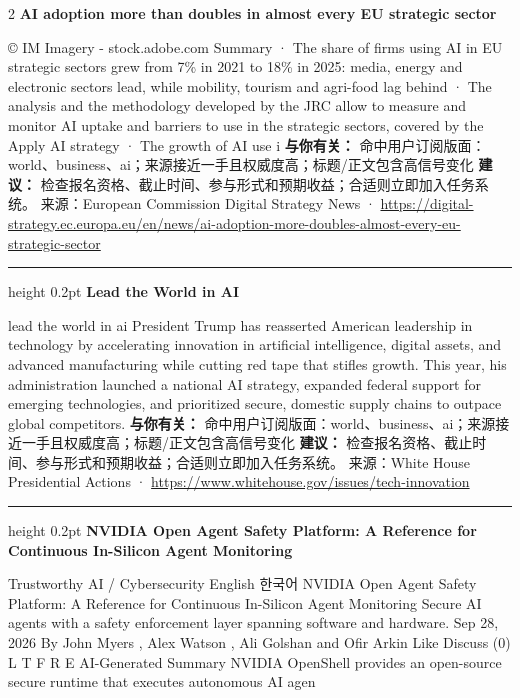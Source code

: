 \documentclass[10.5pt]{ctexart}
\begin{document}
\begin{multicols}{2}
{\large\bfseries AI adoption more than doubles in almost every EU strategic sector}\par
© IM Imagery - stock.adobe.com Summary · The share of firms using AI in EU strategic sectors grew from 7\% in 2021 to 18\% in 2025: media, energy and electronic sectors lead, while mobility, tourism and agri-food lag behind · The analysis and the methodology developed by the JRC allow to measure and monitor AI uptake and barriers to use in the strategic sectors, covered by the Apply AI strategy · The growth of AI use i
\textbf{与你有关：} 命中用户订阅版面：world、business、ai；来源接近一手且权威度高；标题/正文包含高信号变化
\textbf{建议：} 检查报名资格、截止时间、参与形式和预期收益；合适则立即加入任务系统。
{\footnotesize\color{ormuted} 来源：European Commission Digital Strategy News · \url{https://digital-strategy.ec.europa.eu/en/news/ai-adoption-more-doubles-almost-every-eu-strategic-sector}}
\vspace{2mm}
\hrule height 0.2pt
\vspace{2mm}
{\large\bfseries Lead the World in AI}\par
lead the world in ai President Trump has reasserted American leadership in technology by accelerating innovation in artificial intelligence, digital assets, and advanced manufacturing while cutting red tape that stifles growth. This year, his administration launched a national AI strategy, expanded federal support for emerging technologies, and prioritized secure, domestic supply chains to outpace global competitors.
\textbf{与你有关：} 命中用户订阅版面：world、business、ai；来源接近一手且权威度高；标题/正文包含高信号变化
\textbf{建议：} 检查报名资格、截止时间、参与形式和预期收益；合适则立即加入任务系统。
{\footnotesize\color{ormuted} 来源：White House Presidential Actions · \url{https://www.whitehouse.gov/issues/tech-innovation}}
\vspace{2mm}
\hrule height 0.2pt
\vspace{2mm}
{\large\bfseries NVIDIA Open Agent Safety Platform: A Reference for Continuous In-Silicon Agent Monitoring}\par
Trustworthy AI / Cybersecurity English 한국어 NVIDIA Open Agent Safety Platform: A Reference for Continuous In-Silicon Agent Monitoring Secure AI agents with a safety enforcement layer spanning software and hardware. Sep 28, 2026 By John Myers , Alex Watson , Ali Golshan and Ofir Arkin Like Discuss (0) L T F R E AI-Generated Summary NVIDIA OpenShell provides an open-source secure runtime that executes autonomous AI agen

\end{multicols}
\end{document}
